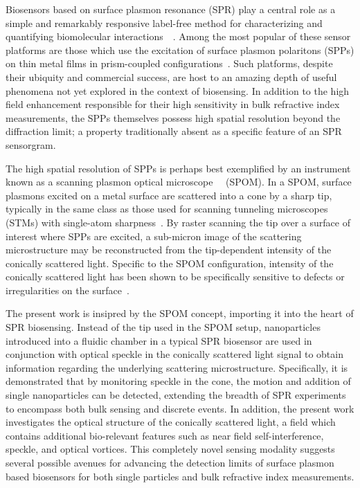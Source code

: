 Biosensors based on surface plasmon resonance (SPR) play a central role as
a simple and remarkably responsive label-free method for characterizing and
quantifying biomolecular
interactions~\cite{homola1999surface}~\cite{homola2006surface}.  Among the most
popular of these sensor platforms are those which use the excitation of surface
plasmon polaritons (SPPs) on thin metal films in prism-coupled
configurations~\cite{hoa2007towards}.  Such platforms, despite their ubiquity
and commercial success, are host to an amazing depth of useful phenomena not
yet explored in the context of biosensing.  In addition to the high field
enhancement responsible for their high sensitivity in bulk refractive index
measurements, the SPPs themselves possess high spatial resolution beyond the
diffraction limit; a property traditionally absent as a specific feature of an
SPR sensorgram.

The high spatial resolution of SPPs is perhaps best exemplified by an
instrument known as a scanning plasmon optical
microscope~\cite{kim1995scanning}~\cite{kim1996scanning} (SPOM).  In a SPOM,
surface plasmons excited on a metal surface are scattered into a cone by
a sharp tip, typically in the same class as those used for scanning tunneling
microscopes (STMs) with single-atom sharpness~\cite{binnig2000scanning}.  By
raster scanning the tip over a surface of interest where SPPs are excited,
a sub-micron image of the scattering microstructure may be reconstructed from
the tip-dependent intensity of the conically scattered light.  Specific to the
SPOM configuration, intensity of the conically scattered light has been shown
to be specifically sensitive to defects or irregularities on the
surface~\cite{kim1996scanning}.

The present work is insipred by the SPOM concept, importing it into the heart
of SPR biosensing.  Instead of the tip used in the SPOM setup, nanoparticles
introduced into a fluidic chamber in a typical SPR biosensor are used in
conjunction with optical speckle in the conically scattered light signal to
obtain information regarding the underlying scattering microstructure.
Specifically, it is demonstrated that by monitoring speckle in the cone, the
motion and addition of single nanoparticles can be detected, extending the
breadth of SPR experiments to encompass both bulk sensing and discrete events.
In addition, the present work investigates the optical structure of the
conically scattered light, a field which contains additional bio-relevant
features such as near field self-interference, speckle, and optical vortices.
This completely novel sensing modality suggests several possible avenues for
advancing the detection limits of surface plasmon based biosensors for both
single particles and bulk refractive index measurements.
